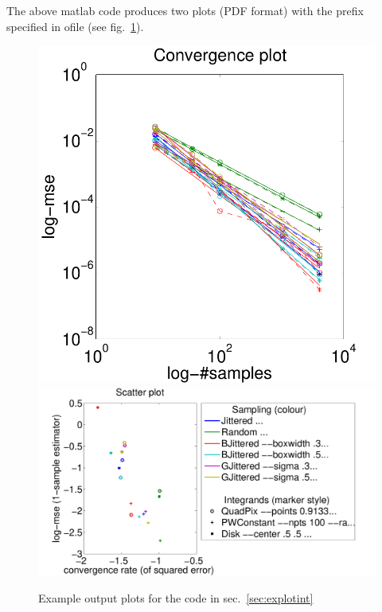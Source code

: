 The above matlab code produces two plots (PDF format) with the prefix specified in ofile (see fig.~\ref{fig:explotint}). 
\begin{figure}[htbp]
\includegraphics[width=0.36\linewidth]{figs/test-convs.pdf} 
\includegraphics[width=0.64\linewidth]{figs/test-scatter.pdf}
\caption{\label{fig:explotint} Example output plots for the code in sec.~\ref{sec:explotint}}
\end{figure}


